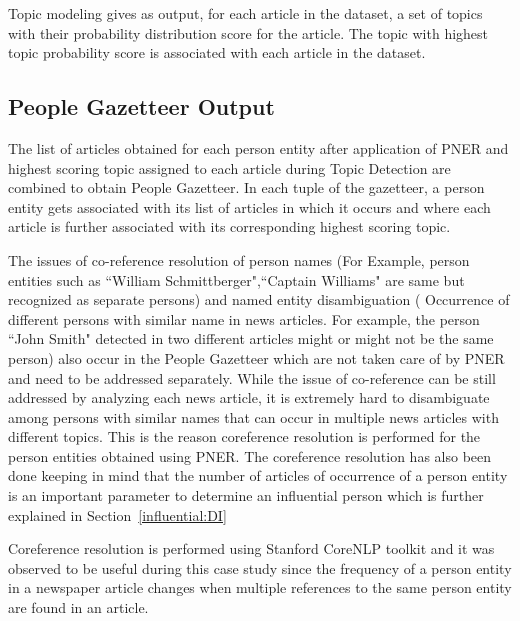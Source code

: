 \documentclass[10pt,journal,compsoc]{IEEEtran}
\begin{document}
Topic modeling gives as output, for each article in the dataset, a set of topics with their probability distribution score for the article. The topic with highest topic probability score is associated with each article in the dataset. 


\subsection{People Gazetteer Output }
\label{gaz:result}

The list of articles obtained for each person entity after application of PNER and highest scoring topic assigned to each article during Topic Detection are combined to obtain People Gazetteer. In each tuple of the gazetteer, a person entity gets associated with its list of articles in which it occurs and where each article is further associated with its corresponding highest scoring topic.


The issues of co-reference resolution of person names (For Example, person entities such as ``William Schmittberger",``Captain Williams" are same but recognized as separate persons) and named entity disambiguation ( Occurrence of different persons with similar name in news articles. For example, the person ``John Smith" detected in two different articles might or might not be the same person) also occur in the People Gazetteer which are not taken care of by PNER and need to be addressed separately. While the issue of co-reference can be still addressed by analyzing each news article, it is extremely hard to disambiguate among persons with similar names that can occur in multiple news articles with different topics. This is the reason coreference resolution is performed for the person entities obtained using PNER. The coreference resolution has also been done keeping in mind that the number of articles of occurrence of a person entity is an important parameter to determine an influential person which is further explained in Section~\ref{influential:DI}

Coreference resolution is performed using Stanford CoreNLP toolkit and it was observed to be useful during this case study since the frequency of a person entity in a newspaper article changes when multiple references to the same person entity are found in an article. 
\end{document}
